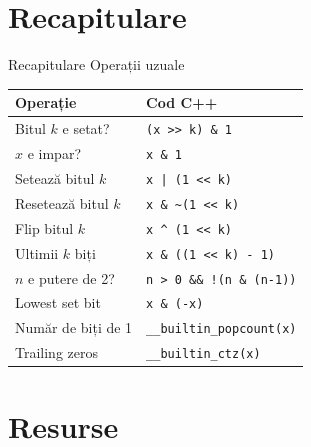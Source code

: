 \documentclass{beamer}
\begin{document}
\section{Recapitulare}

\begin{frame}[fragile]{Recapitulare \textemdash{} Operații uzuale}
  \begin{center}
  \begin{tabular}{ll}
    \toprule
    Operație & Cod C++ \\
    \midrule
    Bitul $k$ e setat?   & \lstinline|(x >> k) & 1| \\
    $x$ e impar?         & \lstinline|x & 1| \\
    Setează bitul $k$    & \lstinline+x | (1 << k)+ \\
    Resetează bitul $k$  & \lstinline|x & ~(1 << k)| \\
    Flip bitul $k$       & \lstinline|x ^ (1 << k)| \\
    Ultimii $k$ biți     & \lstinline|x & ((1 << k) - 1)| \\
    $n$ e putere de 2?   & \lstinline|n > 0 && !(n & (n-1))| \\
    Lowest set bit       & \lstinline|x & (-x)| \\
    Număr de biți de 1   & \lstinline|__builtin_popcount(x)| \\
    Trailing zeros       & \lstinline|__builtin_ctz(x)| \\
    \bottomrule
  \end{tabular}
  \end{center}
\end{frame}

\section{Resurse}
\end{document}
